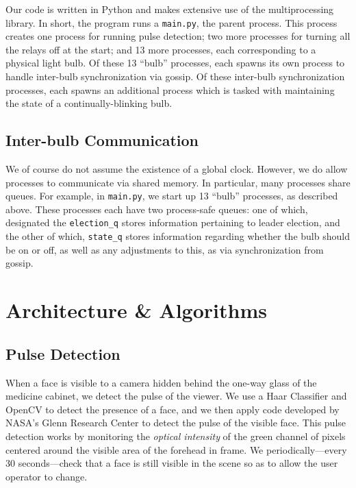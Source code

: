 \documentclass[preprint,review,12pt]{cs262}
\begin{document}
Our code is written in Python and makes extensive use of the multiprocessing library. In short, the program runs a \texttt{main.py}, the parent process. This process creates one process for running pulse detection; two more processes for turning all the relays off at the start; and 13 more processes, each corresponding to a physical light bulb. Of these 13 ``bulb'' processes, each spawns its own process to handle inter-bulb synchronization via gossip. Of these inter-bulb synchronization processes, each spawns an additional process which is tasked with maintaining the state of a continually-blinking bulb. 

\subsection{Inter-bulb Communication}

We of course do not assume the existence of a global clock. However, we do allow processes to communicate via shared memory. In particular, many processes share queues.  For example, in  \texttt{main.py}, we start up 13 ``bulb'' processes, as described above. These processes each have two process-safe queues: one of which, designated the \texttt{election\_q} stores information pertaining to leader election, and the other of which, \texttt{state\_q} stores information regarding whether the bulb should be on or off, as well as any adjustments to this, as via synchronization from gossip. 

\section{Architecture \& Algorithms}

\subsection{Pulse Detection} 

When a face is visible to a camera hidden behind the one-way glass of the medicine cabinet, we detect the pulse of the viewer. We use a Haar Classifier and OpenCV to detect the presence of a face, and we then apply code developed by NASA's Glenn Research Center\cite{NASA} to detect the pulse of the visible face. This pulse detection works by monitoring the \emph{optical intensity} of the green channel of pixels centered around the visible area of the forehead in frame. We periodically---every 30 seconds---check that a face is still visible in the scene so as to allow the user operator to change. 
\end{document}

